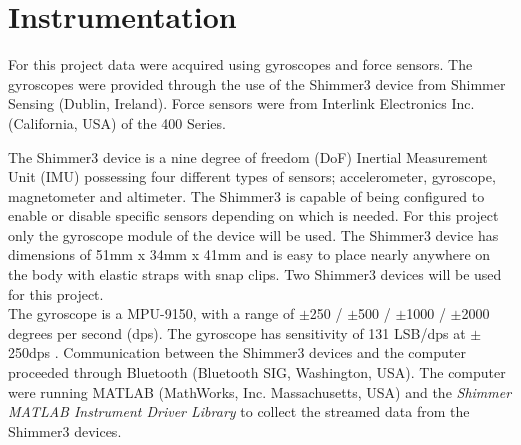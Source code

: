 \section{Instrumentation} \label{methods:instrumentation}

For this project data were acquired using gyroscopes and force sensors. The gyroscopes were provided through the use of the Shimmer3 device from Shimmer Sensing (Dublin, Ireland). Force sensors were from Interlink Electronics Inc. (California, USA) of the 400 Series. %

The Shimmer3 device is a nine degree of freedom (DoF) Inertial Measurement Unit (IMU) possessing four different types of sensors; accelerometer, gyroscope, magnetometer and altimeter. The Shimmer3 is capable of being configured to enable or disable specific sensors depending on which is needed. For this project only the gyroscope module of the device will be used. The Shimmer3 device has dimensions of 51mm x 34mm x 41mm and is easy to place nearly anywhere on the body with elastic straps with snap clips. Two Shimmer3 devices will be used for this project.\\ %
The gyroscope is a MPU-9150, with a range of $\pm$250 / $\pm$500 / $\pm$1000 / $\pm$2000 degrees per second (dps). The gyroscope has sensitivity of 131 LSB/dps at $\pm$250dps \cite{ShimmerSensing2016}.
Communication between the Shimmer3 devices and the computer proceeded through Bluetooth (Bluetooth SIG, Washington, USA). The computer were running MATLAB (MathWorks, Inc. Massachusetts, USA) and the \textit{Shimmer MATLAB Instrument Driver Library} to collect the streamed data from the Shimmer3 devices.



